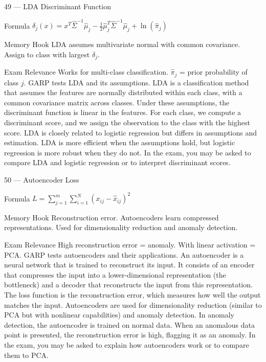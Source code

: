 \documentclass[aspectratio=169,8pt]{beamer}
\begin{document}
	\begin{frame}{49 --- LDA Discriminant Function}
		\begin{block}{Formula}
			$\delta_j(x) = x^T\hat{\Sigma}^{-1}\hat{\mu}_j - \frac{1}{2}\hat{\mu}_j^T\hat{\Sigma}^{-1}\hat{\mu}_j + \ln(\hat{\pi}_j)$
		\end{block}
		\begin{block}{Memory Hook}
			LDA assumes multivariate normal with common covariance. Assign to class with largest $\delta_j$.
		\end{block}
		\begin{block}{Exam Relevance}
			Works for multi-class classification. $\hat{\pi}_j$ = prior probability of class $j$. GARP tests LDA and its assumptions. LDA is a classification method that assumes the features are normally distributed within each class, with a common covariance matrix across classes. Under these assumptions, the discriminant function is linear in the features. For each class, we compute a discriminant score, and we assign the observation to the class with the highest score. LDA is closely related to logistic regression but differs in assumptions and estimation. LDA is more efficient when the assumptions hold, but logistic regression is more robust when they do not. In the exam, you may be asked to compare LDA and logistic regression or to interpret discriminant scores.
		\end{block}
	\end{frame}
	
	\begin{frame}{50 --- Autoencoder Loss}
		\begin{block}{Formula}
			$L = \sum_{j=1}^{m}\sum_{i=1}^{N}(x_{ij} - \hat{x}_{ij})^2$
		\end{block}
		\begin{block}{Memory Hook}
			Reconstruction error. Autoencoders learn compressed representations. Used for dimensionality reduction and anomaly detection.
		\end{block}
		\begin{block}{Exam Relevance}
			High reconstruction error = anomaly. With linear activation = PCA. GARP tests autoencoders and their applications. An autoencoder is a neural network that is trained to reconstruct its input. It consists of an encoder that compresses the input into a lower-dimensional representation (the bottleneck) and a decoder that reconstructs the input from this representation. The loss function is the reconstruction error, which measures how well the output matches the input. Autoencoders are used for dimensionality reduction (similar to PCA but with nonlinear capabilities) and anomaly detection. In anomaly detection, the autoencoder is trained on normal data. When an anomalous data point is presented, the reconstruction error is high, flagging it as an anomaly. In the exam, you may be asked to explain how autoencoders work or to compare them to PCA.
		\end{block}
	\end{frame}
	
\end{document}
